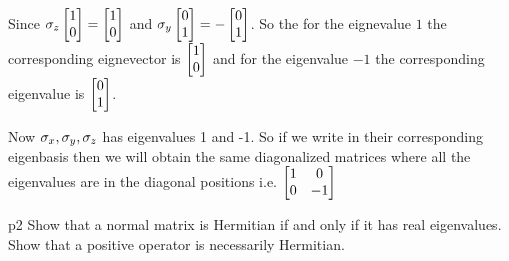 \documentclass[a4paper, 11pt]{article}
\begin{document}
{	Since $\sigma_z\left[\begin{matrix}1\\ 0\end{matrix}\right]=\left[\begin{matrix}1\\ 0\end{matrix}\right]$ and $\sigma_y\left[\begin{matrix}0\\ 1\end{matrix}\right]=-\left[\begin{matrix}0\\ 1\end{matrix}\right]$. So the for the eignevalue $1$ the corresponding eignevector is $\left[\begin{matrix}1\\ 0\end{matrix}\right]$ and for the eigenvalue $-1$ the corresponding eigenvalue is $\left[\begin{matrix}0\\ 1\end{matrix}\right]$.
	
	Now $\sigma_x,\sigma_y,\sigma_z$ has eigenvalues 1 and -1. So if we write in their corresponding eigenbasis then we will obtain the same diagonalized matrices where all the eigenvalues are in the diagonal positions i.e. $\left[\begin{matrix}1 &0\\ 0& -1\end{matrix}\right]$
}
	

\begin{problem}{%
	}{p2%
	}
	Show that a normal matrix is Hermitian if and only if it has real eigenvalues. Show that a positive operator is necessarily Hermitian.
\end{problem}
\end{document}
